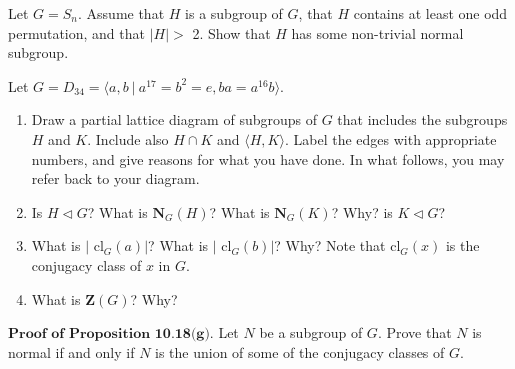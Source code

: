 \documentclass[12pt,letterpaper,boxed]{hmcpset}
\begin{document}

\begin{problem}[10.1.18]
Let $ G = S_n $. Assume that $H$ is a subgroup of $G$, that $H$ contains at least one odd permutation, and that $ \vert H \vert > $ 2. Show that $H$ has some non-trivial normal subgroup. 
\end{problem}

\begin{solution}

\end{solution}

\clearpage

\begin{problem}[10.2.11]
Let $ G = D_{34} = \langle a,b \ \vert \ a^{17} = b^2 = e, ba = a^{16}b \rangle $. 
\begin{enumerate}[label=\alph*]
\item Draw a partial lattice diagram of subgroups of $G$ that includes the subgroups $H$ and $K$. Include also $ H \cap K$ and $ \langle H,K \rangle $. Label the edges  with appropriate numbers, and give reasons for what you have done. \newline In what follows, you may refer back to your diagram. 
\item Is $ H \triangleleft G $? What is $ \textbf{N}_G(H) $? What is $ \textbf{N}_G(K) $? Why? is $ K \triangleleft G $?
\item What is $ \vert $ cl$_G(a) \vert $? What is $ \vert $ cl$_G(b) \vert$? Why? Note that cl$_G(x)$ is the conjugacy class of $x$ in $G$. 
\item What is $\textbf{Z}(G)$? Why?
\end{enumerate}
\end{problem}

\begin{solution}
\end{solution}

\clearpage

\begin{problem}[10.2.15]
$\textbf{Proof of Proposition 10.18(g).}$ Let $N$ be a subgroup of $G$. Prove that $N$ is normal if and only if $N$ is the union of some of the conjugacy classes of $G$. 
\end{problem}

\begin{solution}
\end{solution}

\clearpage
\end{document}
